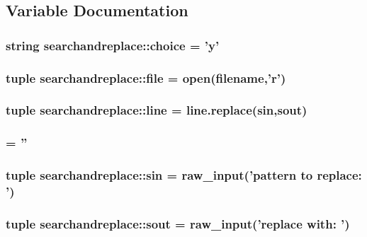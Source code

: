 \subsection{Variable Documentation}
\hypertarget{namespacesearchandreplace_a0f3f5f20522c2bb1eff96f3a115fb82e}{
\subsubsection[{choice}]{\setlength{\rightskip}{0pt plus 5cm}string {\bf searchandreplace::choice} = 'y'}}
\label{namespacesearchandreplace_a0f3f5f20522c2bb1eff96f3a115fb82e}
\hypertarget{namespacesearchandreplace_a6cd74b7607c6c6d298075b8caec8fc5b}{
\subsubsection[{file}]{\setlength{\rightskip}{0pt plus 5cm}tuple {\bf searchandreplace::file} = open(filename,'r')}}
\label{namespacesearchandreplace_a6cd74b7607c6c6d298075b8caec8fc5b}
\hypertarget{namespacesearchandreplace_ab44b2db3542d0e3fcab9386cb031b3f9}{
\subsubsection[{line}]{\setlength{\rightskip}{0pt plus 5cm}tuple {\bf searchandreplace::line} = line.replace({\bf sin},{\bf sout})}}
\label{namespacesearchandreplace_ab44b2db3542d0e3fcab9386cb031b3f9}
\hypertarget{namespacesearchandreplace_a24bb4d92427daa0fb9ba6dbcbc8c6c01}{
\subsubsection[{s}]{ = ''}}
\label{namespacesearchandreplace_a24bb4d92427daa0fb9ba6dbcbc8c6c01}
\hypertarget{namespacesearchandreplace_ac33fb7c76f53a315493ecc066a38886c}{
\subsubsection[{sin}]{\setlength{\rightskip}{0pt plus 5cm}tuple {\bf searchandreplace::sin} = raw\_\-input('pattern to replace: ')}}
\label{namespacesearchandreplace_ac33fb7c76f53a315493ecc066a38886c}
\hypertarget{namespacesearchandreplace_a80a2bb71737fb98d8f4d045dcb7d12c6}{
\subsubsection[{sout}]{\setlength{\rightskip}{0pt plus 5cm}tuple {\bf searchandreplace::sout} = raw\_\-input('replace with: ')}}
\label{namespacesearchandreplace_a80a2bb71737fb98d8f4d045dcb7d12c6}
